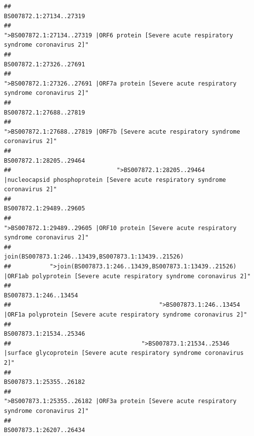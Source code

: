 \documentclass[
]{article}
\begin{document}
\begin{verbatim}
##                                                                                                                BS007872.1:27134..27319 
##                                             ">BS007872.1:27134..27319 |ORF6 protein [Severe acute respiratory syndrome coronavirus 2]" 
##                                                                                                                BS007872.1:27326..27691 
##                                            ">BS007872.1:27326..27691 |ORF7a protein [Severe acute respiratory syndrome coronavirus 2]" 
##                                                                                                                BS007872.1:27688..27819 
##                                                    ">BS007872.1:27688..27819 |ORF7b [Severe acute respiratory syndrome coronavirus 2]" 
##                                                                                                                BS007872.1:28205..29464 
##                              ">BS007872.1:28205..29464 |nucleocapsid phosphoprotein [Severe acute respiratory syndrome coronavirus 2]" 
##                                                                                                                BS007872.1:29489..29605 
##                                            ">BS007872.1:29489..29605 |ORF10 protein [Severe acute respiratory syndrome coronavirus 2]" 
##                                                                                    join(BS007873.1:246..13439,BS007873.1:13439..21526) 
##           ">join(BS007873.1:246..13439,BS007873.1:13439..21526) |ORF1ab polyprotein [Severe acute respiratory syndrome coronavirus 2]" 
##                                                                                                                  BS007873.1:246..13454 
##                                          ">BS007873.1:246..13454 |ORF1a polyprotein [Severe acute respiratory syndrome coronavirus 2]" 
##                                                                                                                BS007873.1:21534..25346 
##                                     ">BS007873.1:21534..25346 |surface glycoprotein [Severe acute respiratory syndrome coronavirus 2]" 
##                                                                                                                BS007873.1:25355..26182 
##                                            ">BS007873.1:25355..26182 |ORF3a protein [Severe acute respiratory syndrome coronavirus 2]" 
##                                                                                                                BS007873.1:26207..26434 

\end{verbatim}
\end{document}
